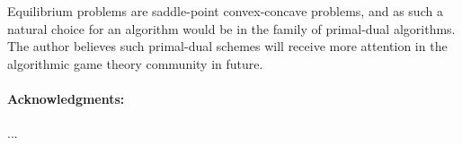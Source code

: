 \documentclass{article} %
\begin{document}
Equilibrium problems are saddle-point convex-concave problems, and as
such a natural choice for an algorithm would be in the family of
primal-dual algorithms. The author believes such primal-dual schemes
will receive more attention in the algorithmic game theory community
in future.


\medskip \noindent

\paragraph{Acknowledgments:} ...
\small


\end{document}
